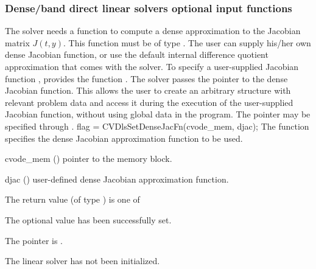 \subsubsection{Dense/band direct linear solvers optional input functions}
\label{sss:optin_dls}
The 
{\cvdense} solver needs a function to compute a dense approximation to
the Jacobian matrix $J(t,y)$.  This function must be of type . 
The user can supply his/her own dense Jacobian function, or use the default 
internal difference quotient approximation
that comes with the {\cvdense} solver.
To specify a user-supplied Jacobian function , {\cvdense} provides 
the function .
The {\cvdense} solver passes the pointer  
to the dense Jacobian function. This allows the user to
create an arbitrary structure with relevant problem data and access it
during the execution of the user-supplied Jacobian function, without
using global data in the program.  
The pointer  may be specified through .
{
  flag = CVDlsSetDenseJacFn(cvode\_mem, djac);
}
{
  The function  specifies the dense Jacobian
  approximation function to be used.
}
{
  \begin{args}
  \item[cvode\_mem] ()
    pointer to the {\cvode} memory block.
  \item[djac] ()
    user-defined dense Jacobian approximation function.
  \end{args}
}
{
  The return value  (of type ) is one of
  \begin{args}
  \item[\Id{CVDLS\_SUCCESS}] 
    The optional value has been successfully set.
  \item[\Id{CVDLS\_MEM\_NULL}]
    The  pointer is .
  \item[\Id{CVDLS\_LMEM\_NULL}]
    The {\cvdense} linear solver has not been initialized.
  \end{args}
}
